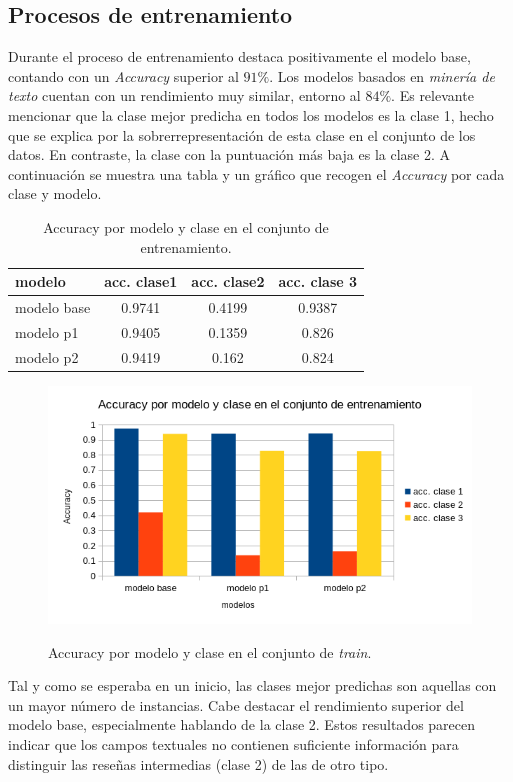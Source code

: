 \documentclass[es]{uc3mreport}
\begin{document}
\begin{report}
\subsection{Procesos de entrenamiento}
\label{subsec:comparar_train}
Durante el proceso de entrenamiento destaca positivamente el modelo base,
contando con un \textit{Accuracy} superior al $91\%$. Los modelos basados en
\textit{minería de texto} cuentan con un rendimiento muy similar, entorno al
$84\%$. Es relevante mencionar que la clase mejor predicha en todos los modelos
es la clase 1, hecho que se explica por la sobrerrepresentación de esta clase en
el conjunto de los datos. En contraste, la clase con la puntuación más baja es
la clase 2. A continuación se muestra una tabla y un gráfico que recogen el
\textit{Accuracy} por cada clase y modelo.
\begin{table}
\begin{tabular}{@{}lccc@{}}
    \toprule
    modelo      & acc. clase1&	acc. clase2	& acc. clase 3 \\
    \midrule     
    modelo base & 0.9741 & 0.4199	& 0.9387 \\
    modelo p1   & 0.9405 & 0.1359	& 0.826 \\
    modelo p2   & 0.9419 & 0.162	& 0.824 \\
    \bottomrule
\end{tabular}
    \caption{Accuracy por modelo y clase en el conjunto de entrenamiento.}
\end{table}
\begin{figure}[H]
    \center
    \includegraphics[width=0.85\linewidth]{accModClassTrain.png}\\
    \caption{Accuracy por modelo y clase en el conjunto de \textit{train}.}
\end{figure}

Tal y como se esperaba en un inicio, las clases mejor predichas son aquellas con
un mayor número de instancias. Cabe destacar el rendimiento superior del modelo
base, especialmente hablando de la clase 2. Estos resultados parecen indicar que
los campos textuales no contienen suficiente información para distinguir las
reseñas intermedias (clase 2) de las de otro tipo.


\end{report}
\end{document}
